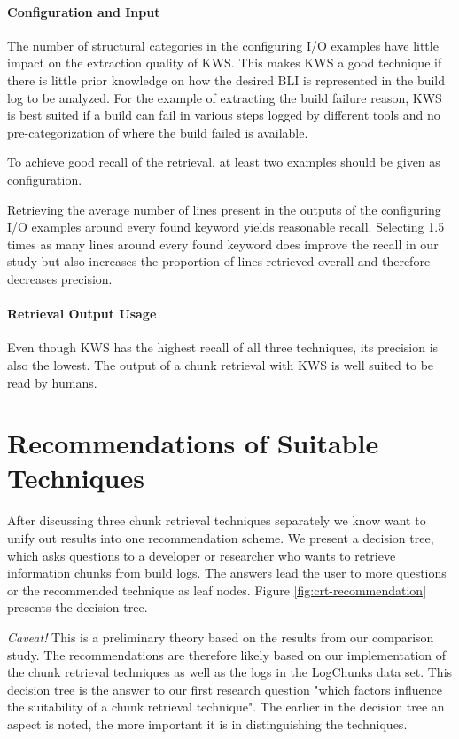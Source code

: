 \documentclass[\myrootdir/main.tex]{subfiles}
\begin{document}
\paragraph{Configuration and Input}
The number of structural categories in the configuring I/O examples have little impact on the extraction quality of KWS\@.
This makes KWS a good technique if there is little prior knowledge on how the desired BLI is represented in the build log to be analyzed.
For the example of extracting the build failure reason, KWS is best suited if a build can fail in various steps logged by different tools and no pre-categorization of where the build failed is available.

To achieve good recall of the retrieval, at least two examples should be given as configuration.

Retrieving the average number of lines present in the outputs of the configuring I/O examples around every found keyword yields reasonable recall.
Selecting 1.5 times as many lines around every found keyword does improve the recall in our study but also increases the proportion of lines retrieved overall and therefore decreases precision.

\paragraph{Retrieval Output Usage}
Even though KWS has the highest recall of all three techniques, its precision is also the lowest.
The output of a chunk retrieval with KWS is well suited to be read by humans.

\section{Recommendations of Suitable Techniques}
After discussing three chunk retrieval techniques separately we know want to unify out results into one recommendation scheme.
We present a decision tree, which asks questions to a developer or researcher who wants to retrieve information chunks from build logs.
The answers lead the user to more questions or the recommended technique as leaf nodes.
Figure \ref{fig:crt-recommendation} presents the decision tree.

\emph{Caveat!} This is a preliminary theory based on the results from our comparison study.
The recommendations are therefore likely based on our implementation of the chunk retrieval techniques as well as the logs in the LogChunks data set.
This decision tree is the answer to our first research question "which factors influence the suitability of a chunk retrieval technique".
The earlier in the decision tree an aspect is noted, the more important it is in distinguishing the techniques.
\end{document}
